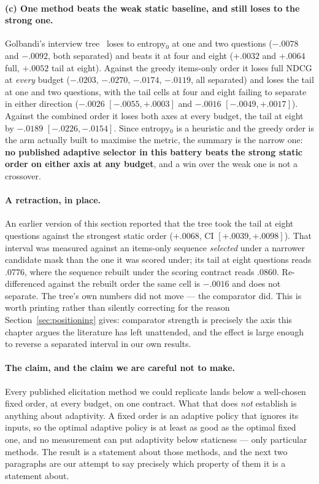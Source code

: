 \documentclass[11pt]{article}
\begin{document}
\paragraph{(c) One method beats the weak static baseline, and still loses to the strong one.}
Golbandi's interview tree~\cite{golbandi2011adaptive} loses to entropy$_0$ at one and two questions
($-.0078$ and $-.0092$, both separated) and beats it at four and eight ($+.0032$ and $+.0064$ full,
$+.0052$ tail at eight). Against the greedy items-only order it loses full NDCG at \emph{every}
budget ($-.0203$, $-.0270$, $-.0174$, $-.0119$, all separated) and loses the tail at one and two
questions, with the tail cells at four and eight failing to separate in either direction
($-.0026$ $[-.0055,+.0003]$ and $-.0016$ $[-.0049,+.0017]$). Against the combined order it loses
both axes at every budget, the tail at eight by $-.0189$ $[-.0226,-.0154]$. Since entropy$_0$ is a
heuristic and the greedy order is the arm actually built to maximise the metric, the summary is the
narrow one: \textbf{no published adaptive selector in this battery beats the strong static order on
either axis at any budget}, and a win over the weak one is not a crossover.

\paragraph{A retraction, in place.} An earlier version of this section reported that the tree took
the tail at eight questions against the strongest static order ($+.0068$, CI $[+.0039,+.0098]$).
That interval was measured against an items-only sequence \emph{selected} under a narrower candidate
mask than the one it was scored under; its tail at eight questions reads $.0776$, where the sequence
rebuilt under the scoring contract reads $.0860$. Re-differenced against the rebuilt order the same
cell is $-.0016$ and does not separate. The tree's own numbers did not move --- the comparator did.
This is worth printing rather than silently correcting for the reason
Section~\ref{sec:positioning} gives: comparator strength is precisely the axis this chapter argues
the literature has left unattended, and the effect is large enough to reverse a separated interval
in our own results.

\paragraph{The claim, and the claim we are careful not to make.} Every published elicitation method
we could replicate lands below a well-chosen fixed order, at every budget, on one contract. What that
does \emph{not} establish is anything about adaptivity. A fixed order is an adaptive policy that
ignores its inputs, so the optimal adaptive policy is at least as good as the optimal fixed one, and
no measurement can put adaptivity below staticness --- only particular methods. The result is a
statement about those methods, and the next two paragraphs are our attempt to say precisely which
property of them it is a statement about.
\end{document}
